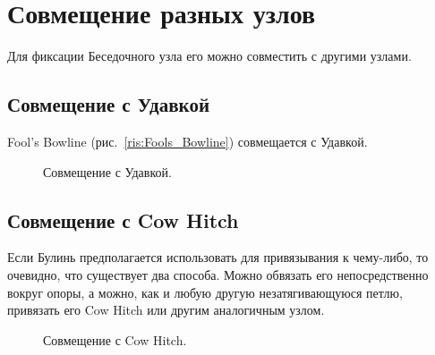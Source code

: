 \documentclass{artikel1}
\begin{document}

\section{Совмещение разных узлов}


Для фиксации Беседочного узла его можно совместить с другими узлами.

\subsection{Совмещение с Удавкой}

Fool's Bowline (рис.~\ref{ris:Fools_Bowline}) совмещается с Удавкой.

\begin{figure}[H]\centering
	\begin{minipage}{1\linewidth}
		\begin{center}
			\tcbox[enhanced jigsaw,colframe=black,opacityframe=0.5,opacityback=0.5]
			{\centering{}}
		\end{center}
	\end{minipage}
\caption{Совмещение с Удавкой.}
\label{ris:Besedochny-udav}
\end{figure}

\subsection{Совмещение с Cow Hitch}

Если Булинь предполагается использовать для привязывания к чему-либо, то очевидно, что существует два способа. Можно обвязать его непосредственно вокруг опоры, а можно, как и любую другую незатягивающуюся петлю, привязать его Cow Hitch или другим аналогичным узлом.

\begin{figure}[H]\centering
	\begin{minipage}{1\linewidth}
		\begin{center}
			\tcbox[enhanced jigsaw,colframe=black,opacityframe=0.5,opacityback=0.5]
			{\centering{}}
		\end{center}
	\end{minipage}
	\caption{Совмещение с Cow Hitch.}
	\label{ris:Besedochny_Cow_Hitch}
\end{figure}
\end{document}
